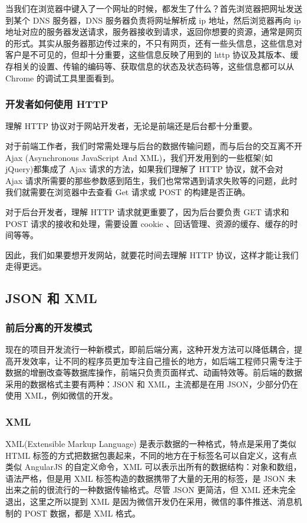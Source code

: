 \documentclass[UTF8]{ctexbook}
\begin{document}
                当我们在浏览器中键入了一个网址的时候，都发生了什么？首先浏览器把网址发送到某个 DNS 服务器，DNS 服务器负责将网址解析成 ip 地址，然后浏览器再向 ip 地址对应的服务器发送请求，服务器接收到请求，返回你想要的资源，通常是网页的形式。其实从服务器那边传过来的，不只有网页，还有一些头信息，这些信息对客户是不可见的，但却十分重要，这些信息反映了用到的 http 协议及其版本、缓存相关的设置、传输的编码等、获取信息的状态及状态码等，这些信息都可以从 Chrome 的调试工具里面看到。

            \subsubsection{开发者如何使用 HTTP}
              \label{subsubsec:开发者如何使用_http}
                理解 HTTP 协议对于网站开发者，无论是前端还是后台都十分重要。
                \par
                对于前端工作者，我们时常需处理与后台的数据传输问题，而与后台的交互离不开 Ajax (Asynchronous JavaScript And XML)，我们开发用到的一些框架(如 jQuery)都集成了 Ajax 请求的方法，如果我们理解了 HTTP 协议，就不会对 Ajax 请求所需要的那些参数感到陌生，我们也常常遇到请求失败等的问题，此时我们就需要在浏览器中去查看 Get 请求或 POST 的构建是否正确。
                \par
                对于后台开发者，理解 HTTP 请求就更重要了，因为后台要负责 GET 请求和 POST 请求的接收和处理，需要设置 cookie 、回话管理、资源的缓存、缓存的时间等等。
                \par
                因此，我们如果要想开发网站，就要花时间去理解 HTTP 协议，这样才能让我们走得更远。

        \subsection{JSON 和 XML}
          \label{subsec:json_和_xml}
            \subsubsection{前后分离的开发模式}
              \label{subsubsec:前后分离的开发模式}
                现在的项目开发流行一种新模式，即前后端分离，这种开发方法可以降低耦合，提高开发效率，让不同的程序员更加专注自己擅长的地方，如后端工程师只需专注于数据的增删改查等数据库操作，前端只负责页面样式、动画特效等。前后端的数据采用的数据格式主要有两种：JSON 和 XML，主流都是在用 JSON，少部分仍在使用 XML，例如微信的开发。
            \subsubsection{XML}
              \label{subsubsec:XML}
                XML(Extensible Markup Language) 是表示数据的一种格式，特点是采用了类似 HTML 标签的方式把数据包裹起来，不同的地方在于标签名可以自定义，这有点类似 AngularJS 的自定义命令，XML 可以表示出所有的数据结构：对象和数组，语法严格，但是用 XML 标签构造的数据携带了大量的无用的标签，是 JSON 未出来之前的很流行的一种数据传输格式。尽管 JSON 更简洁，但 XML 还未完全退出，这里之所以提到 XML 是因为微信开发仍在采用，微信的事件推送、消息机制的 POST 数据，都是 XML 格式。
\end{document}
